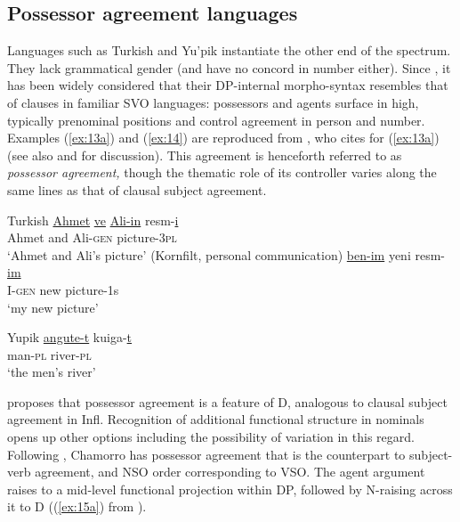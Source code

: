 \documentclass[output=paper
,modfonts
,nonflat]{langsci/langscibook}
\begin{document}
\subsection{Possessor agreement languages} \label{sec:2.2}
Languages such as Turkish and Yu'pik instantiate the other end of the spectrum. They lack grammatical gender (and have no concord in number either). Since \citet{Abney1987}, it has been widely considered that their DP-internal morpho-syntax resembles that of clauses in familiar SVO languages: possessors and agents surface in high, typically prenominal positions and control agreement in person and number. Examples (\ref{ex:13a}) and (\ref{ex:14}) are reproduced from \citet{Abney1987}, who cites \citet{Underhill1976} for (\ref{ex:13a}) (see also \citealt{Gavruseva2000} and \citealt{Haegeman2004} for discussion). This agreement is henceforth referred to as \textit{possessor agreement,} though the thematic role of its controller varies along the same lines as that of clausal subject agreement. 

\begin{exe}
	\ex Turkish \label{ex:13}
	\xlist
	\ex \label{ex:13a}
	\gll \underline{Ahmet} \underline{ve} \underline{Ali-in}     resm-\underline{i}  \\
	Ahmet and Ali-\textsc{gen}   picture-3\textsc{pl}\\
	\glt `Ahmet and Ali's picture'  	
	\ex (Kornfilt, personal communication) \newline
	\gll \underline{ben-im}   yeni  resm-\underline{im}\\
	I-\textsc{gen}  new   picture-1s\\
	\glt `my new picture'
	\endxlist
\end{exe}

\begin{exe}
	\ex Yupik \label{ex:14}
	\gll \underline{angute-t}		kuiga-\underline{t}\\
	man-\textsc{pl}    river-\textsc{pl}\\
	\glt `the men's river'  	
\end{exe}
\citet{Abney1987} proposes that possessor agreement is a feature of D, analogous to clausal subject agreement in Infl. Recognition of additional functional structure in nominals opens up other options including the possibility of variation in this regard. Following \citet{Chung1982}, Chamorro has possessor agreement that is the counterpart to subject-verb agreement, and NSO order corresponding to VSO. The agent argument raises to a mid-level functional projection within DP, followed by N-raising across it to D ((\ref{ex:15a}) from \citealt[127]{Chung1982}).
\end{document}
